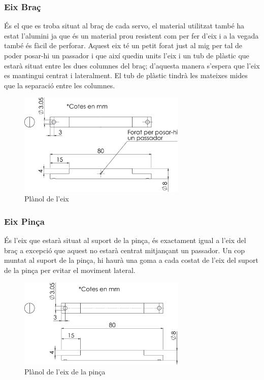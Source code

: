 \subsubsection{Eix Braç}
És el que es troba situat al braç de cada servo, el material utilitzat també ha estat l'alumini ja que és un material prou resistent com per fer d'eix i a la vegada també és fàcil de perforar.
Aquest eix té un petit forat just al mig per tal de poder posar-hi un passador i que així quedin units l'eix i un tub de plàstic que estarà situat entre les dues columnes del braç; d'aquesta manera s'espera que l'eix es mantingui centrat i lateralment. El tub de plàstic tindrà les mateixes mides que la separació entre les columnes.
\begin{figure}[h!]
\centering
\includegraphics[width=8cm]{./sketch/eix}
\caption{Plànol de l'eix}
\end{figure}

\subsubsection{Eix Pinça}
És l'eix que estarà situat al suport de la pinça, és exactament igual a l'eix del braç a excepció que aquest no estarà centrat mitjançant un passador. Un cop muntat al suport de la pinça, hi haurà una goma a cada costat de l'eix del suport de la pinça per evitar el moviment lateral.
\begin{figure}[h!]
\centering
\includegraphics[width=8cm]{./sketch/eix2}
\caption{Plànol de l'eix de la pinça}
\end{figure}

